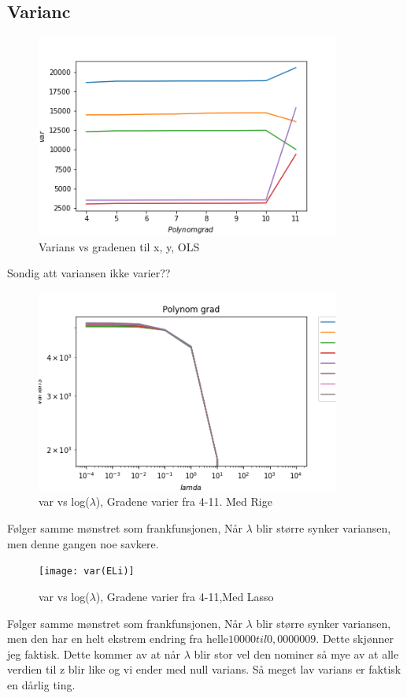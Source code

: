 \documentclass[norsk,a4paper,12pt]{article}
\begin{document}
\subsection*{Varianc}
\begin{figure}[H]
\includegraphics[width=100mm]{varE_OLS}
\caption{Varians vs gradenen til x, y, OLS }
\end{figure}
Sondig att variansen ikke varier??

\begin{figure}[H]
\includegraphics[width=100mm]{var(ERi)}
\caption{var vs log($\lambda$), Gradene varier fra 4-11. Med Rige }
\end{figure}
Følger samme mønstret som frankfunsjonen, Når $\lambda$ blir større synker variansen, men denne gangen noe savkere. 
\begin{figure}[H]
\texttt{[image: var(ELi)]}
\caption{var vs log($\lambda$), Gradene varier fra 4-11,Med Lasso   }
\end{figure}
Følger samme mønstret som frankfunsjonen, Når $\lambda$ blir større synker variansen, men den har en helt ekstrem endring fra helle$10000 til 0,0000009$. Dette skjønner jeg faktisk. Dette kommer av at når $\lambda$ blir stor vel den nominer så mye av at alle verdien til z blir like og vi ender med null varians. Så meget lav varians er faktisk en dårlig ting. 
\end{document}
